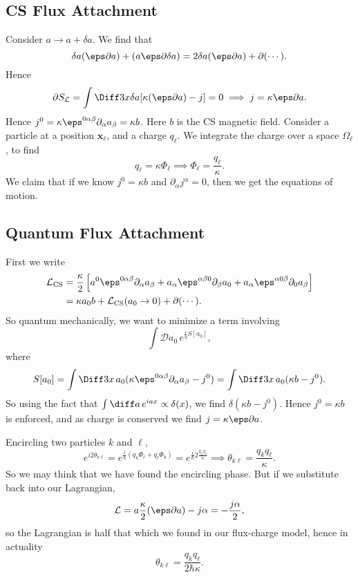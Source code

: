 \documentclass[12pt]{article}
\begin{document}
\subsection{CS Flux Attachment}%
\label{sub:csf}

Consider $a \to a + \delta a$. We find that
\[
\delta a(\eps \partial a) + (a \eps \partial \delta a) = 2 \delta a( \eps \partial a) + \partial(\cdots).
\]
Hence
\[
	\partial S_{\mathcal{L}} = \int \Diff 3 x \delta a[\kappa(\eps \partial a)- j] = 0 \implies j = \kappa \eps \partial a.
\]
Hence $j^0 = \kappa \eps^{0\alpha\beta} \partial_\alpha a_\beta = \kappa b$. Here $b$ is the CS magnetic field. Consider a particle at a position $\mathbf{x}_\ell$, and a charge $q_\ell$. We integrate the charge over a space $\Omega_\ell$, to find
\[
q_\ell = \kappa \Phi_\ell \implies \Phi_\ell = \frac{q_\ell}{\kappa}.
\]
We claim that if we know $j^0 = \kappa b$ and $\partial_\alpha j^\alpha = 0$, then we get the equations of motion.

\subsection{Quantum Flux Attachment}%
\label{sub:qfa}

First we write
\begin{align*}
	\mathcal{L}_{\mathrm{CS}} &= \frac{\kappa}{2} \left[ a^0 \eps^{0\alpha\beta} \partial_\alpha a_\beta + a_\alpha \eps^{\alpha\beta0} \partial_\beta a_0 + a_\alpha \eps^{\alpha0\beta} \partial_0 a_\beta\right] \\
				  &= \kappa a_0 b + \mathcal{L}_{\mathrm{CS}}(a_0 \to 0) + \partial(\cdots).
\end{align*}
So quantum mechanically, we want to minimize a term involving
\[
	\int \mathcal{D} a_0 \, e^{\frac{i}{\eta} S[a_0]},
\]
where
\[
	S[a_0]= \int \Diff 3 x \, a_0(\kappa \eps^{0 \alpha\beta} \partial_\alpha a_\beta - j^0) = \int \Diff3x\, a_0(\kappa b- j^0).
\]
So using the fact that $\int \diff a \, e^{iax} \propto \delta(x)$, we find $\delta(\kappa b - j^0)$. Hence $j^0 = \kappa b$ is enforced, and as charge is conserved we find $j = \kappa\eps \partial a$.

Encircling two particles $k$ and $\ell$,
\[
	e^{i2 \theta_{k\ell}} = e^{\frac{i}{\hbar} (q_k \Phi_\ell + q_\ell \Phi_k)} = e^{\frac{i}{\hbar} 2 \frac{q_k q_\ell}{\kappa}} \implies \theta_{k\ell} = \frac{q_k q_\ell}{\kappa}.
\]
So we may think that we have found the encircling phase. But if we substitute back into our Lagrangian,
\[
\mathcal{L} = a \frac{\kappa}{2} (\eps \partial a) - j \alpha = - \frac{j \alpha}{2},
\]
so the Lagrangian is half that which we found in our flux-charge model, hence in actuality
\[
\theta_{k\ell} = \frac{q_k q_\ell}{2 \hbar \kappa}.
\]
\end{document}

